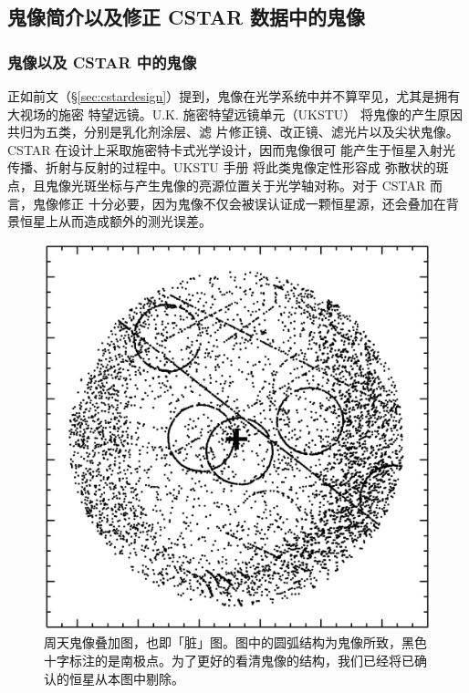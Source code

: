 \subsection{鬼像简介以及修正 CSTAR 数据中的鬼像} \label{sec:ghost}

\subsubsection{鬼像以及 CSTAR 中的鬼像}
正如前文（\S \ref{sec:cstardesign}）提到，鬼像在光学系统中并不算罕见，尤其是拥有大视场的施密
特望远镜。U.K. 施密特望远镜单元（UKSTU） 将鬼像的产生原因共归为五类，分别是乳化剂涂层、滤
片修正镜、改正镜、滤光片以及尖状鬼像。CSTAR 在设计上采取施密特卡式光学设计，因而鬼像很可
能产生于恒星入射光传播、折射与反射的过程中。UKSTU 手册\cite{1983ukstu} 将此类鬼像定性形容成
弥散状的斑点，且鬼像光斑坐标与产生鬼像的亮源位置关于光学轴对称。对于 CSTAR 而言，鬼像修正
十分必要，因为鬼像不仅会被误认证成一颗恒星源，还会叠加在背景恒星上从而造成额外的测光误差。

\begin{figure}[t]
\centering
\includegraphics[width=1.0\textwidth]{figures/chapter2/f3_ghoststack.eps}
\caption{周天鬼像叠加图，也即「脏」图。图中的圆弧结构为鬼像所致，黑色十字标注的是南极点。为了更好的看清鬼像的结构，我们已经将已确认的恒星从本图中剔除。}
\label{fig:ghoststack}
\end{figure}

